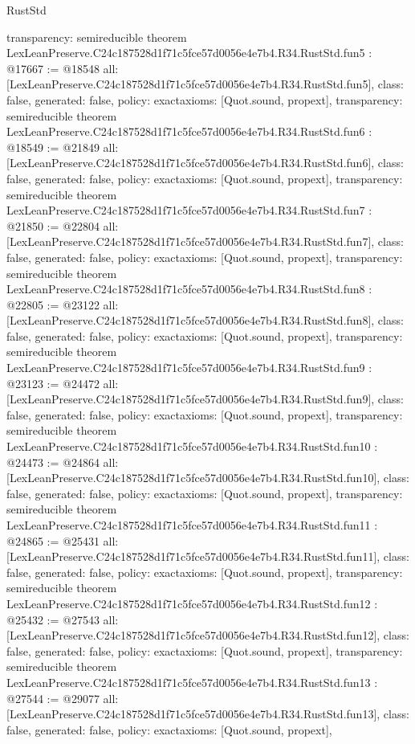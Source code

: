 \begin{lexlean}{RustStd}
\begin{coremodule}
{  transparency: semireducible
}
theorem LexLeanPreserve.C24c187528d1f71c5fce57d0056e4e7b4.R34.RustStd.fun5 : @17667 := @18548 {
  all: [LexLeanPreserve.C24c187528d1f71c5fce57d0056e4e7b4.R34.RustStd.fun5],
  class: false,
  generated: false,
  policy: exact{axioms: [Quot.sound, propext]},
  transparency: semireducible
}
theorem LexLeanPreserve.C24c187528d1f71c5fce57d0056e4e7b4.R34.RustStd.fun6 : @18549 := @21849 {
  all: [LexLeanPreserve.C24c187528d1f71c5fce57d0056e4e7b4.R34.RustStd.fun6],
  class: false,
  generated: false,
  policy: exact{axioms: [Quot.sound, propext]},
  transparency: semireducible
}
theorem LexLeanPreserve.C24c187528d1f71c5fce57d0056e4e7b4.R34.RustStd.fun7 : @21850 := @22804 {
  all: [LexLeanPreserve.C24c187528d1f71c5fce57d0056e4e7b4.R34.RustStd.fun7],
  class: false,
  generated: false,
  policy: exact{axioms: [Quot.sound, propext]},
  transparency: semireducible
}
theorem LexLeanPreserve.C24c187528d1f71c5fce57d0056e4e7b4.R34.RustStd.fun8 : @22805 := @23122 {
  all: [LexLeanPreserve.C24c187528d1f71c5fce57d0056e4e7b4.R34.RustStd.fun8],
  class: false,
  generated: false,
  policy: exact{axioms: [Quot.sound, propext]},
  transparency: semireducible
}
theorem LexLeanPreserve.C24c187528d1f71c5fce57d0056e4e7b4.R34.RustStd.fun9 : @23123 := @24472 {
  all: [LexLeanPreserve.C24c187528d1f71c5fce57d0056e4e7b4.R34.RustStd.fun9],
  class: false,
  generated: false,
  policy: exact{axioms: [Quot.sound, propext]},
  transparency: semireducible
}
theorem LexLeanPreserve.C24c187528d1f71c5fce57d0056e4e7b4.R34.RustStd.fun10 : @24473 := @24864 {
  all: [LexLeanPreserve.C24c187528d1f71c5fce57d0056e4e7b4.R34.RustStd.fun10],
  class: false,
  generated: false,
  policy: exact{axioms: [Quot.sound, propext]},
  transparency: semireducible
}
theorem LexLeanPreserve.C24c187528d1f71c5fce57d0056e4e7b4.R34.RustStd.fun11 : @24865 := @25431 {
  all: [LexLeanPreserve.C24c187528d1f71c5fce57d0056e4e7b4.R34.RustStd.fun11],
  class: false,
  generated: false,
  policy: exact{axioms: [Quot.sound, propext]},
  transparency: semireducible
}
theorem LexLeanPreserve.C24c187528d1f71c5fce57d0056e4e7b4.R34.RustStd.fun12 : @25432 := @27543 {
  all: [LexLeanPreserve.C24c187528d1f71c5fce57d0056e4e7b4.R34.RustStd.fun12],
  class: false,
  generated: false,
  policy: exact{axioms: [Quot.sound, propext]},
  transparency: semireducible
}
theorem LexLeanPreserve.C24c187528d1f71c5fce57d0056e4e7b4.R34.RustStd.fun13 : @27544 := @29077 {
  all: [LexLeanPreserve.C24c187528d1f71c5fce57d0056e4e7b4.R34.RustStd.fun13],
  class: false,
  generated: false,
  policy: exact{axioms: [Quot.sound, propext]},
}
\end{coremodule}
\end{lexlean}
